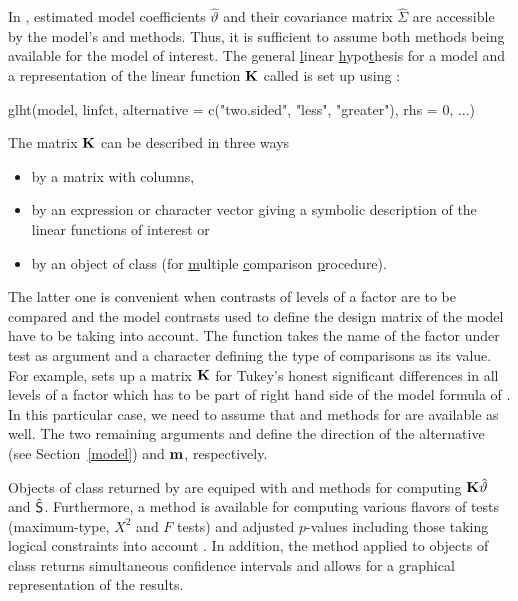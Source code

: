 \documentclass[12pt]{article}
\begin{document}
In \RR, estimated model coefficients $\hat{\vartheta}$ and their covariance 
matrix $\hat{\Sigma}$ are accessible by the model's  
and  methods. Thus, it is sufficient to assume both
methods being available for the model of interest. The \underline{g}eneral
\underline{l}inear \underline{h}ypo\underline{t}hesis for a model 
 and a representation of the linear function $\K$
called  is set up using :
\begin{Sinput}
glht(model, linfct, alternative = c("two.sided", "less", "greater"), 
     rhs = 0, ...)
\end{Sinput}
The matrix $\K$ can be described in three ways
\begin{itemize}
\item by a matrix with  columns,
\item by an expression or character vector giving a symbolic description 
      of the linear functions of interest or
\item by an object of class  
      (for \underline{m}ultiple \underline{c}omparison \underline{p}rocedure).
\end{itemize}
The latter one is convenient when contrasts of levels of a factor are
to be compared and the model contrasts used to define the design matrix
of the model have to be taking into account. The  function
takes the name of the factor under test as argument and a character 
defining the type of comparisons as its value. For example,
 sets up a matrix $\K$ for Tukey's honest
significant differences in all levels of a factor 
which has to be part of right hand side of the model formula
of . In this particular case, we need to assume
that  and  methods for 
 are available as well. The two remaining arguments
 and  define the direction
of the alternative (see Section~\ref{model}) and $\m$, respectively.

Objects of class  returned by  are equiped with
 and  methods for computing
$\K \hat{\vartheta}$ and $\hat{\S}$. Furthermore, a  method
is available for computing various flavors of tests (maximum-type, $X^2$ and $F$
tests) and adjusted $p$-values including those taking 
logical constraints into account \citep{Shaffer1986, Westfall1997}.
In addition, the  method applied to objects of class 
 returns simultaneous confidence intervals and allows
for a graphical representation of the results.
\end{document}

